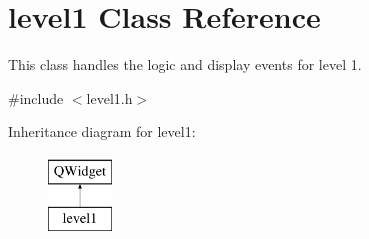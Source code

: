 \hypertarget{classlevel1}{}\section{level1 Class Reference}
\label{classlevel1}


This class handles the logic and display events for level 1.  




{\ttfamily \#include $<$level1.\+h$>$}

Inheritance diagram for level1\+:\begin{figure}[H]
\begin{center}
\leavevmode
\includegraphics[height=2.000000cm]{classlevel1}
\end{center}
\end{figure}

